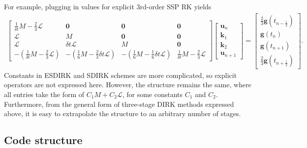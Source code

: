 \documentclass[a4paper,10pt]{article}
\begin{document}
For example, plugging in values for explicit 3rd-order SSP RK yields
\begin{align*}
\begin{bmatrix} \tfrac{1}{\delta t}M - \tfrac{2}{3}\mathcal{L} & \mathbf{0}  & \mathbf{0} & \mathbf{0}  \\
	\mathcal{L} & M & \mathbf{0} & \mathbf{0} \\
	\mathcal{L} & \delta t \mathcal{L} & M & \mathbf{0} \\
	-\left(\tfrac{1}{\delta t}M - \tfrac{2}{3}\mathcal{L}\right) & -\left(\tfrac{1}{6}M  - \tfrac{2}{3}\delta t\mathcal{L}\right) &
	-\left(\tfrac{1}{6}M  - \tfrac{1}{6}\delta t \mathcal{L}\right) & \tfrac{1}{\delta t}M - \tfrac{2}{3}\mathcal{L}  \end{bmatrix}
	\begin{bmatrix} \mathbf{u}_n \\ \mathbf{k}_1 \\ \mathbf{k}_2 \\ \mathbf{u}_{n+1} \end{bmatrix} =
	\begin{bmatrix} \tfrac{2}{3}\mathbf{g}(t_{n-\frac{1}{2}}) \\ \mathbf{g}(t_{n}) \\ \mathbf{g}(t_{n+1}) \\ \tfrac{2}{3}\mathbf{g}(t_{n+\frac{1}{2}}) \end{bmatrix}.
\end{align*}
%
Constants in ESDIRK and SDIRK schemes are more complicated, so explicit operators are not expressed here.
However, the structure remains the same, where all entries take the form of $C_1M + C_2\mathcal{L}$, for
some constants $C_1$ and $C_2$. Furthermore, from the general form of three-stage DIRK methods
expressed above, it is easy to extrapolate the structure to an arbitrary number of stages.

\subsection{Code structure}
\end{document}

